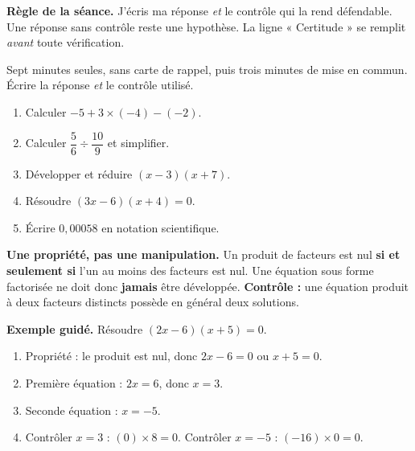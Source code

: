 \documentclass[10pt,a4paper]{article}
\begin{document}
\begin{graybox}\small\textbf{Règle de la séance.} J'écris ma réponse \emph{et} le contrôle qui la rend défendable. Une réponse sans contrôle reste une hypothèse. La ligne « Certitude » se remplit \emph{avant} toute vérification.\end{graybox}
\par\vspace{2mm}
Sept minutes seules, sans carte de rappel, puis trois minutes de mise en commun. Écrire la réponse \emph{et} le contrôle utilisé.
\begin{enumerate}
\item Calculer $-5 + 3\times(-4) - (-2)$.
\item Calculer $\dfrac{5}{6}\div\dfrac{10}{9}$ et simplifier.
\item Développer et réduire $(x-3)(x+7)$.
\item Résoudre $(3x-6)(x+4)=0$.
\item Écrire $0{,}00058$ en notation scientifique.
\end{enumerate}
\certline
\aideline
\needspace{62mm}\par\vspace{3mm}
\begin{methodbox}
\textbf{Une propriété, pas une manipulation.} Un produit de facteurs est nul \textbf{si et seulement si}
l'un au moins des facteurs est nul. Une équation sous forme factorisée ne doit donc \textbf{jamais} être développée.
\textbf{Contrôle :} une équation produit à deux facteurs distincts possède en général deux solutions.
\end{methodbox}
\begin{graybox}
\textbf{Exemple guidé.} Résoudre $(2x - 6)(x + 5) = 0$.
\begin{enumerate}
\item Propriété : le produit est nul, donc $2x - 6 = 0$ ou $x + 5 = 0$.
\item Première équation : $2x = 6$, donc $x = 3$.
\item Seconde équation : $x = -5$.
\item Contrôler $x = 3$ : $(0)\times 8 = 0$. Contrôler $x = -5$ : $(-16)\times 0 = 0$.
\end{enumerate}
\end{graybox}
\end{document}
